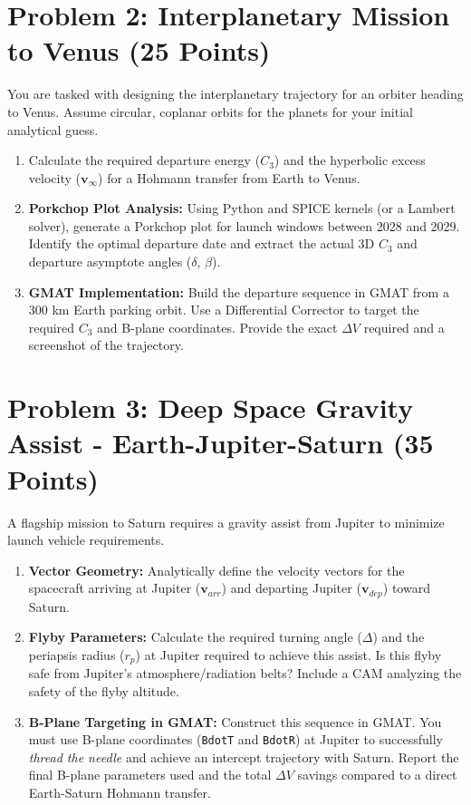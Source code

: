 \documentclass[11pt, letterpaper]{article}
\begin{document}
\section*{Problem 2: Interplanetary Mission to Venus (25 Points)}
You are tasked with designing the interplanetary trajectory for an orbiter heading to Venus. Assume circular, coplanar orbits for the planets for your initial analytical guess.
\begin{enumerate}
    \item[(a)] Calculate the required departure energy ($C_3$) and the hyperbolic excess velocity ($\boldsymbol{v}_\infty$) for a Hohmann transfer from Earth to Venus.
    \item[(b)] \textbf{Porkchop Plot Analysis:} Using Python and SPICE kernels (or a Lambert solver), generate a Porkchop plot for launch windows between 2028 and 2029. Identify the optimal departure date and extract the actual 3D $C_3$ and departure asymptote angles ($\delta$, $\beta$).
    \item[(c)] \textbf{GMAT Implementation:} Build the departure sequence in GMAT from a 300 km Earth parking orbit. Use a Differential Corrector to target the required $C_3$ and B-plane coordinates. Provide the exact $\Delta V$ required and a screenshot of the trajectory.
\end{enumerate}

\section*{Problem 3: Deep Space Gravity Assist - Earth-Jupiter-Saturn (35 Points)}
A flagship mission to Saturn requires a gravity assist from Jupiter to minimize launch vehicle requirements.
\begin{enumerate}
    \item[(a)] \textbf{Vector Geometry:} Analytically define the velocity vectors for the spacecraft arriving at Jupiter ($\boldsymbol{v}_{arr}$) and departing Jupiter ($\boldsymbol{v}_{dep}$) toward Saturn. 
    \item[(b)] \textbf{Flyby Parameters:} Calculate the required turning angle ($\Delta$) and the periapsis radius ($r_p$) at Jupiter required to achieve this assist. Is this flyby safe from Jupiter's atmosphere/radiation belts? Include a CAM analyzing the safety of the flyby altitude.
    \item[(c)] \textbf{B-Plane Targeting in GMAT:} Construct this sequence in GMAT. You must use B-plane coordinates (\texttt{BdotT} and \texttt{BdotR}) at Jupiter to successfully \textit{thread the needle} and achieve an intercept trajectory with Saturn. Report the final B-plane parameters used and the total $\Delta V$ savings compared to a direct Earth-Saturn Hohmann transfer.
\end{enumerate}
\end{document}
